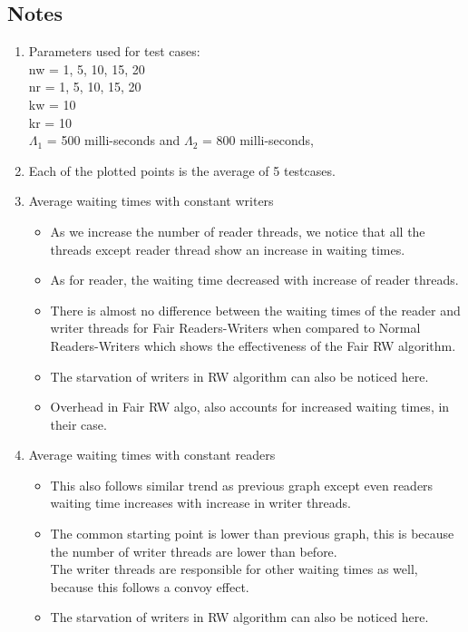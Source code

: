 \documentclass[12pt]{article}
\begin{document}
\newpage

\subsection{Notes}
\begin{enumerate}
\item Parameters used for test cases:\\
nw = 1, 5, 10, 15, 20\\
nr = 1, 5, 10, 15, 20\\
kw = 10\\
kr = 10\\
$\Lambda _1$ = 500 milli-seconds and $\Lambda _2$ = 800 milli-seconds,\\
\item Each of the plotted points is the average of 5 testcases.\\
\item Average waiting times with constant writers
	\begin{itemize}
	\item As we increase the number of reader threads, we notice that all the threads except reader thread show an increase in waiting times.
	\item As for reader, the waiting time decreased with increase of reader threads.
	\item There is almost no difference between the waiting times of the reader and
				writer threads for Fair Readers-Writers when compared to Normal Readers-Writers which
				shows the effectiveness of the Fair RW algorithm.
	\item The starvation of writers in RW algorithm can also be noticed here.
	\item Overhead in Fair RW algo, also accounts for increased waiting times, in their case.
	\end{itemize}
\item Average waiting times with constant readers
	\begin{itemize}
	\item This also follows similar trend as previous graph except even readers waiting time increases with 				increase in writer threads.
	\item The common starting point is lower than previous graph, this is because the number of writer threads are lower than before.\\
	The writer threads are responsible for other waiting times as well, because this follows a convoy effect.
	\item The starvation of writers in RW algorithm can also be noticed here.

\end{itemize}
\end{enumerate}
\end{document}
